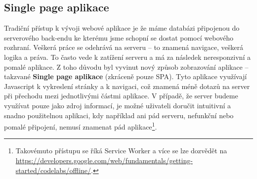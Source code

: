 \subsection{Single page aplikace}
\par Tradiční přístup k vývoji webové aplikace je že máme databázi připojenou do serverového back-endu ke kterému jsme schopní se dostat pomocí webového rozhraní. Veškerá práce se odehrává na serveru -- to znamená navigace, veškerá logika a práva. To často vede k zatížení serveru a má za následek neresponzivní a pomalé aplikace. Z toho důvodu byl vyvinut nový způsob zobrazování aplikace -- takzvané \textbf{Single page aplikace} (zkráceně pouze SPA). Tyto aplikace využívají Javascript k vykreslení stránky a k navigaci, což znamená méně dotazů na server při přechodu mezi jednotlivými částmi aplikace. V případě, že server budeme využívat pouze jako zdroj informací, je možné uživateli doručit intuitivní a snadno použitelnou aplikaci, kdy například ani pád serveru, nefunkční nebo pomalé připojení, nemusí znamenat pád aplikace\footnote{Takovémuto přístupu se říká Service Worker a více se lze dozvědět na \url{https://developers.google.com/web/fundamentals/getting-started/codelabs/offline/}.}. \cite{serverless-singlepage-apps}

